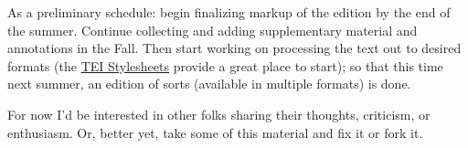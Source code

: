 \documentclass[
  12pt,
]{article}
\begin{document}
As a preliminary schedule: begin finalizing markup of the edition by the
end of the summer. Continue collecting and adding supplementary material
and annotations in the Fall. Then start working on processing the text
out to desired formats (the
\href{http://www.tei-c.org/Tools/Stylesheets/}{TEI Stylesheets} provide
a great place to start); so that this time next summer, an edition of
sorts (available in multiple formats) is done.

For now I'd be interested in other folks sharing their thoughts,
criticism, or enthusiasm. Or, better yet, take some of this material and
fix it or fork it.
\end{document}
